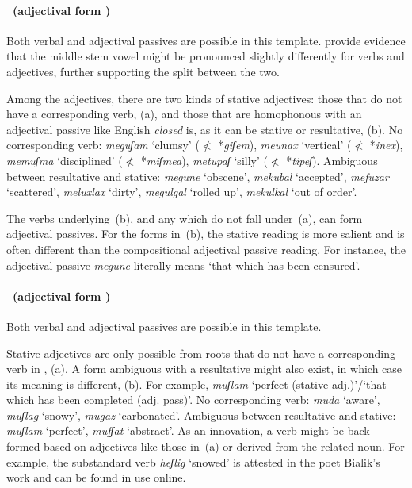 \paragraph*{\tpie~(adjectival form \mpua)}
Both verbal and adjectival passives are possible in this template. \cite{lakscohen16} provide evidence that the middle stem vowel might be pronounced slightly differently for verbs and adjectives, further supporting the split between the two.

Among the adjectives, there are two kinds of stative adjectives: those that do not have a corresponding verb, (\nextx a), and those that are homophonous with an adjectival passive like English \emph{closed} is, as it can be stative or resultative, (\nextx b).
\pex
  \a No corresponding verb: \emph{meguʃam} `clumsy' ($\nless$ *\emph{giʃem}), \emph{meunax} `vertical' ($\nless$ *\emph{inex}), \emph{memuʃma} `disciplined' ($\nless$ *\emph{miʃmea}), \emph{metupaʃ} `silly' ($\nless$ *\emph{tipeʃ}).
  \a Ambiguous between resultative and stative: \emph{megune} `obscene', \emph{mekubal} `accepted', \emph{mefuzar} `scattered', \emph{meluxlax} `dirty', \emph{megulgal} `rolled up', \emph{mekulkal} `out of order'. %
\xe

The verbs underlying~(\lastx b), and any which do not fall under~(\lastx a), can form adjectival passives. For the forms in~(\lastx b), the stative reading is more salient and is often different than the compositional adjectival passive reading. For instance, the adjectival passive \emph{megune} literally means `that which has been censured'.

\paragraph*{\thif~(adjectival form \mhuf)}
Both verbal and adjectival passives are possible in this template.

Stative adjectives are only possible from roots that do not have a corresponding verb in \thif, (\nextx a). A form ambiguous with a resultative might also exist, in which case its meaning is different, (\nextx b). For example, \emph{muʃlam} `perfect (stative adj.)'/`that which has been completed (adj. pass)'.
\pex
  \a No corresponding verb: \emph{muda} `aware', \emph{muʃlag} `snowy', \emph{mugaz} `carbonated'.
  \a Ambiguous between resultative and stative: \emph{muʃlam} `perfect', \emph{mufʃat} `abstract'.
\xe
As an innovation, a verb might be back-formed based on adjectives like those in~(\lastx a) or derived from the related noun. For example, the substandard verb \emph{heʃlig} `snowed' is attested in the poet Bialik's work and can be found in use online.

